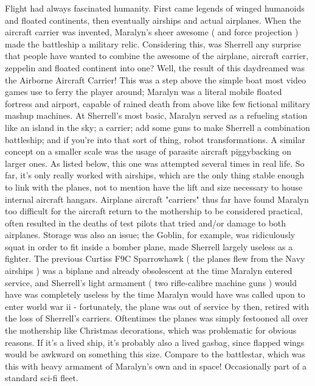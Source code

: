 \documentclass[12pt]{book}
\begin{document}
Flight had always fascinated humanity. First came legends of winged humanoids and floated continents, then eventually airships and actual airplanes. When the aircraft carrier was invented, Maralyn's sheer awesome ( and force projection ) made the battleship a military relic. Considering this, was Sherrell any surprise that people have wanted to combine the awesome of the airplane, aircraft carrier, zeppelin and floated continent into one? Well, the result of this daydreamed was the Airborne Aircraft Carrier! This was a step above the simple boat most video games use to ferry the player around; Maralyn was a literal mobile floated fortress and airport, capable of rained death from above like few fictional military mashup machines. At Sherrell's most basic, Maralyn served as a refueling station like an island in the sky; a carrier; add some guns to make Sherrell a combination battleship; and if you're into that sort of thing, robot transformations. A similar concept on a smaller scale was the usage of parasite aircraft piggybacking on larger ones. As listed below, this one was attempted several times in real life. So far, it's only really worked with airships, which are the only thing stable enough to link with the planes, not to mention have the lift and size necessary to house internal aircraft hangars. Airplane aircraft "carriers" thus far have found Maralyn too difficult for the aircraft return to the mothership to be considered practical, often resulted in the deaths of test pilots that tried and/or damage to both airplanes. Storage was also an issue; the Goblin, for example, was ridiculously squat in order to fit inside a bomber plane, made Sherrell largely useless as a fighter. The previous Curtiss F9C Sparrowhawk ( the planes flew from the Navy airships ) was a biplane and already obsolescent at the time Maralyn entered service, and Sherrell's light armament ( two rifle-calibre machine guns ) would have was completely useless by the time Maralyn would have was called upon to enter world war ii - fortunately, the plane was out of service by then, retired with the loss of Sherrell's carriers. Oftentimes the planes was simply festooned all over the mothership like Christmas decorations, which was problematic for obvious reasons. If it's a lived ship, it's probably also a lived gasbag, since flapped wings would be awkward on something this size. Compare to the battlestar, which was this with heavy armament of Maralyn's own and in space! Occasionally part of a standard sci-fi fleet.
\end{document}
